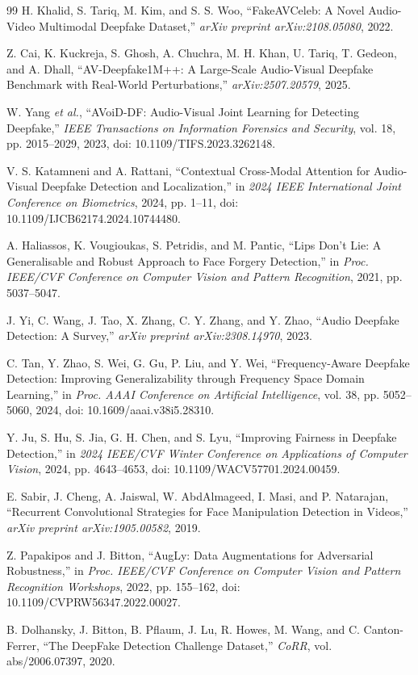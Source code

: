 \begin{thebibliography}{99}
H. Khalid, S. Tariq, M. Kim, and S. S. Woo, ``FakeAVCeleb: A Novel Audio-Video Multimodal Deepfake Dataset,'' \emph{arXiv preprint arXiv:2108.05080}, 2022.

Z. Cai, K. Kuckreja, S. Ghosh, A. Chuchra, M. H. Khan, U. Tariq, T. Gedeon, and A. Dhall, ``AV-Deepfake1M++: A Large-Scale Audio-Visual Deepfake Benchmark with Real-World Perturbations,'' \emph{arXiv:2507.20579}, 2025.

W. Yang \emph{et al.}, ``AVoiD-DF: Audio-Visual Joint Learning for Detecting Deepfake,'' \emph{IEEE Transactions on Information Forensics and Security}, vol. 18, pp. 2015--2029, 2023, doi: 10.1109/TIFS.2023.3262148.

V. S. Katamneni and A. Rattani, ``Contextual Cross-Modal Attention for Audio-Visual Deepfake Detection and Localization,'' in \emph{2024 IEEE International Joint Conference on Biometrics}, 2024, pp. 1--11, doi: 10.1109/IJCB62174.2024.10744480.

A. Haliassos, K. Vougioukas, S. Petridis, and M. Pantic, ``Lips Don't Lie: A Generalisable and Robust Approach to Face Forgery Detection,'' in \emph{Proc. IEEE/CVF Conference on Computer Vision and Pattern Recognition}, 2021, pp. 5037--5047.

J. Yi, C. Wang, J. Tao, X. Zhang, C. Y. Zhang, and Y. Zhao, ``Audio Deepfake Detection: A Survey,'' \emph{arXiv preprint arXiv:2308.14970}, 2023.

C. Tan, Y. Zhao, S. Wei, G. Gu, P. Liu, and Y. Wei, ``Frequency-Aware Deepfake Detection: Improving Generalizability through Frequency Space Domain Learning,'' in \emph{Proc. AAAI Conference on Artificial Intelligence}, vol. 38, pp. 5052--5060, 2024, doi: 10.1609/aaai.v38i5.28310.

Y. Ju, S. Hu, S. Jia, G. H. Chen, and S. Lyu, ``Improving Fairness in Deepfake Detection,'' in \emph{2024 IEEE/CVF Winter Conference on Applications of Computer Vision}, 2024, pp. 4643--4653, doi: 10.1109/WACV57701.2024.00459.

E. Sabir, J. Cheng, A. Jaiswal, W. AbdAlmageed, I. Masi, and P. Natarajan, ``Recurrent Convolutional Strategies for Face Manipulation Detection in Videos,'' \emph{arXiv preprint arXiv:1905.00582}, 2019.

Z. Papakipos and J. Bitton, ``AugLy: Data Augmentations for Adversarial Robustness,'' in \emph{Proc. IEEE/CVF Conference on Computer Vision and Pattern Recognition Workshops}, 2022, pp. 155--162, doi: 10.1109/CVPRW56347.2022.00027.

B. Dolhansky, J. Bitton, B. Pflaum, J. Lu, R. Howes, M. Wang, and C. Canton-Ferrer, ``The DeepFake Detection Challenge Dataset,'' \emph{CoRR}, vol. abs/2006.07397, 2020.

\end{thebibliography}